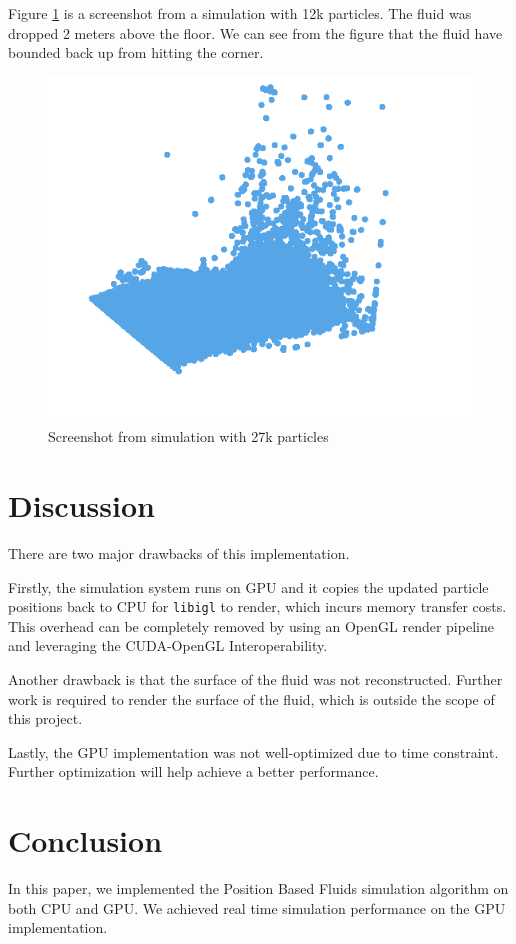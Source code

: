 \documentclass[sigconf]{acmart}
\begin{document}
Figure \ref{fig:splash} is a screenshot from a simulation with 12k particles. The fluid was dropped 2 meters above the floor. We can see from the figure that the fluid have bounded back up from hitting the corner.
\begin{figure}
  \centering
  \includegraphics[width=\linewidth]{image/splash.png}
  \caption{Screenshot from simulation with 27k particles}
\label{fig:splash}
\end{figure}

\section{Discussion}
There are two major drawbacks of this implementation. 

Firstly, the simulation system runs on GPU and it copies the updated particle positions back to CPU for \verb|libigl| \cite{libigl} to render, which incurs memory transfer costs. This overhead can be completely removed by using an OpenGL render pipeline and leveraging the CUDA-OpenGL Interoperability\cite{cuda-interop}.

Another drawback is that the surface of the fluid was not reconstructed. Further work is required to render the surface of the fluid, which is outside the scope of this project.

Lastly, the GPU implementation was not well-optimized due to time constraint. Further optimization will help achieve a better performance.


\section{Conclusion}
In this paper, we implemented the Position Based Fluids simulation algorithm on both CPU and GPU. We achieved real time simulation performance on the GPU implementation.



\end{document}
